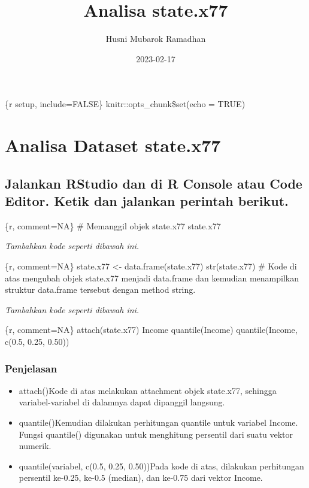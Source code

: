 \documentclass[
]{article}
\title{Analisa state.x77}
\author{Husni Mubarok Ramadhan}
\date{2023-02-17}
\begin{document}
\maketitle

\{r setup, include=FALSE\} knitr::opts\_chunk\$set(echo = TRUE)

\hypertarget{analisa-dataset-state.x77}{%
\section{Analisa Dataset state.x77}\label{analisa-dataset-state.x77}}

\hypertarget{jalankan-rstudio-dan-di-r-console-atau-code-editor.-ketik-dan-jalankan-perintah-berikut.}{%
\subsection{Jalankan RStudio dan di R Console atau Code Editor. Ketik
dan jalankan perintah
berikut.}\label{jalankan-rstudio-dan-di-r-console-atau-code-editor.-ketik-dan-jalankan-perintah-berikut.}}

\{r, comment=NA\} \# Memanggil objek state.x77 state.x77

\emph{Tambahkan kode seperti dibawah ini.}

\{r, comment=NA\} state.x77 \textless- data.frame(state.x77)
str(state.x77) \# Kode di atas mengubah objek state.x77 menjadi
data.frame dan kemudian menampilkan struktur data.frame tersebut dengan
method string.

\emph{Tambahkan kode seperti dibawah ini.}

\{r, comment=NA\} attach(state.x77) Income quantile(Income)
quantile(Income, c(0.5, 0.25, 0.50))

\hypertarget{penjelasan}{%
\subsubsection{Penjelasan}\label{penjelasan}}

\begin{itemize}
\item
  attach()\newline Kode di atas melakukan attachment objek state.x77,
  sehingga variabel-variabel di dalamnya dapat dipanggil langsung.
\item
  quantile()\newline Kemudian dilakukan perhitungan quantile untuk
  variabel Income. Fungsi quantile() digunakan untuk menghitung
  persentil dari suatu vektor numerik.
\item
  quantile(variabel, c(0.5, 0.25, 0.50))\newline Pada kode di atas,
  dilakukan perhitungan persentil ke-0.25, ke-0.5 (median), dan ke-0.75
  dari vektor Income.
\end{itemize}
\end{document}
